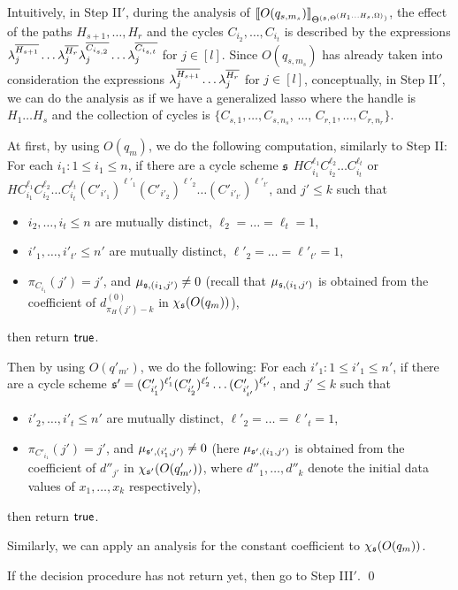 Intuitively, in Step II$'$, during the analysis of $\llbracket O(q_{s, m_{s}})\rrbracket_{\Theta^{({\mathfrak{s} },\Theta^{(H_1 \dots H_{s}, \Omega)} ) } }$, the effect of the paths $H_{s+1},  \dots,  H_r$ and the cycles $C_{i_{2}}, \dots, C_{i_{t}}$ is described by the expressions $\lambda^{\overline{H_{s+1}}}_j \dots \lambda^{\overline{H_{r}}}_j  \lambda^{\overline{C_{i_{s,2}}}}_j \dots \lambda^{\overline{C_{i_{s,t}}}}_j $ for $j \in [l]$. Since $O(q_{s, m_{s}})$ has already taken into consideration the expressions $\lambda^{\overline{H_{s+1}}}_j \dots \lambda^{\overline{H_{r}}}_j$ for $j \in [l]$, conceptually, in Step II$'$, we can do the analysis as if we have a generalized lasso where the handle is $H_1\dots H_s$ and the collection of cycles is $\{C_{s,1},\dots, C_{s,n_s}$, $\dots$, $C_{r,1},\dots, C_{r,n_r}\}$. 
\hide
{
At first, by using $O(q_m)$, we do the following computation, similarly to Step II: For each $i_1: 1 \le i_1 \le n$, if there are a cycle scheme ${\mathfrak{s} }$  
$HC_{i_1}^{\ell_1} C_{i_2}^{\ell_2} \dots C_{i_t}^{\ell_t}
$
or 
$HC_{i_1}^{\ell_1} C_{i_2}^{\ell_2} \dots C_{i_t}^{\ell_t} (C'_{i'_1})^{\ell'_1} (C'_{i'_2})^{\ell'_2} \dots (C'_{i'_{t'}})^{\ell'_{t'}}$,
and $j' \le k$ such that 
\begin{itemize}
\item $i_2,\dots,i_t \le n$ are mutually distinct, $\ell_2 = \dots = \ell_t = 1$, 
%
\item $i'_1,\dots,i'_{t'} \le n'$ are mutually distinct, $\ell'_2 = \dots = \ell'_{t'} = 1$, 
%
\item $\pi_{C_{i_1}}(j')=j'$, and $\mu_{{\mathfrak{s} },(i_1,j')} \neq 0$ (recall that $\mu_{{\mathfrak{s} },(i_1,j')}$ is obtained from the coefficient of $d^{(0)}_{\pi_H(j')-k}$ in  $\chi_{\mathfrak{s} }(O(q_m))$), 
\end{itemize}
then return $\mathsf{true}$. 

Then by using $O(q'_{m'})$, we do the following: For each $i'_1: 1 \le i'_1 \le n'$, if there are a cycle scheme ${\mathfrak{s} }' =(C'_{i'_1})^{\ell'_1} (C'_{i'_2})^{\ell'_2} \dots (C'_{i'_{t'}})^{\ell'_{t'}}$, and $j' \le k$ such that
\begin{itemize}
\item $i'_2,\dots,i'_t \le n'$ are mutually distinct, $\ell'_2 = \dots = \ell'_t = 1$, 
%
\item $\pi_{C'_{i_1}}(j')=j'$, and $\mu_{{\mathfrak{s} }',(i'_1,j')} \neq 0$ (here $\mu_{{\mathfrak{s} }',(i_1,j')}$ is obtained from the coefficient of $d''_{j'}$ in  $\chi_{{\mathfrak{s} }'}(O(q'_{m'}))$, where $d''_1,\dots,d''_k$ denote the initial data values of $x_1,\dots,x_k$ respectively),
\end{itemize}
then return $\mathsf{true}$. 

Similarly, we can apply an analysis for the constant coefficient to $\chi_{\mathfrak{s} }(O(q_m))$. 


If the decision procedure has not return yet, then go to Step III$'$. \qed
}
